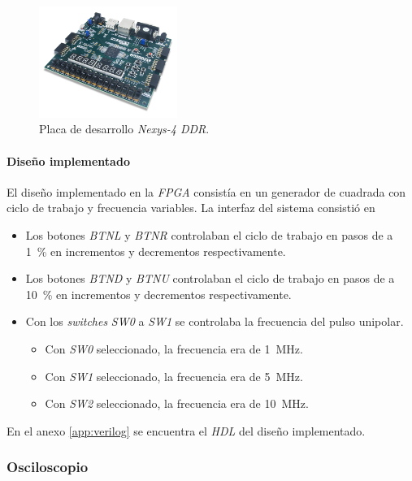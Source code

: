 \begin{figure}
  \centering
    \includegraphics[width=0.4\textwidth]{images/mediciones_fpga.png}
    \caption{Placa de desarrollo \textit{Nexys-4 DDR}.}
    \label{fig:mediciones_fpga}
\end{figure}

\paragraph{Diseño implementado}

El diseño implementado en la \textit{FPGA} consistía en un generador de cuadrada con
ciclo de trabajo y frecuencia variables. La interfaz del sistema consistió en

\begin{itemize}
  \item Los botones \textit{BTNL} y \textit{BTNR} controlaban el ciclo de
    trabajo en pasos de a \qty{1}{\percent} en incrementos y decrementos
    respectivamente.
  \item Los botones \textit{BTND} y \textit{BTNU} controlaban el ciclo de
    trabajo en pasos de a \qty{10}{\percent} en incrementos y decrementos
    respectivamente.
  \item Con los \textit{switches} \textit{SW0} a \textit{SW1} se controlaba la
    frecuencia del pulso unipolar.
    \begin{itemize}
      \item Con \textit{SW0} seleccionado, la frecuencia era de
        \qty{1}{\mega\hertz}.
      \item Con \textit{SW1} seleccionado, la frecuencia era de
        \qty{5}{\mega\hertz}.
      \item Con \textit{SW2} seleccionado, la frecuencia era de
        \qty{10}{\mega\hertz}.
    \end{itemize}
\end{itemize}

En el anexo \ref{app:verilog} se encuentra el \textit{HDL} del diseño implementado.

\subsubsection{Osciloscopio}

